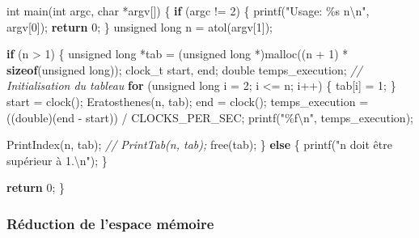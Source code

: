 \documentclass[
    ]{article}
\newenvironment{Shaded}{}{}
\newcommand{\CommentTok}[1]{\textcolor[rgb]{0.38,0.63,0.69}{\textit{#1}}}
\newcommand{\ControlFlowTok}[1]{\textcolor[rgb]{0.00,0.44,0.13}{\textbf{#1}}}
\newcommand{\DataTypeTok}[1]{\textcolor[rgb]{0.56,0.13,0.00}{#1}}
\newcommand{\DecValTok}[1]{\textcolor[rgb]{0.25,0.63,0.44}{#1}}
\newcommand{\KeywordTok}[1]{\textcolor[rgb]{0.00,0.44,0.13}{\textbf{#1}}}
\newcommand{\NormalTok}[1]{#1}
\newcommand{\SpecialCharTok}[1]{\textcolor[rgb]{0.25,0.44,0.63}{#1}}
\newcommand{\StringTok}[1]{\textcolor[rgb]{0.25,0.44,0.63}{#1}}
\begin{document}
\begin{Shaded}
\begin{Highlighting}[]
\DataTypeTok{int}\NormalTok{ main(}\DataTypeTok{int}\NormalTok{ argc, }\DataTypeTok{char}\NormalTok{ *argv[])}
\NormalTok{\{}
    \ControlFlowTok{if}\NormalTok{ (argc != }\DecValTok{2}\NormalTok{)}
\NormalTok{    \{}
\NormalTok{        printf(}\StringTok{"Usage: \%s n}\SpecialCharTok{\textbackslash{}n}\StringTok{"}\NormalTok{, argv[}\DecValTok{0}\NormalTok{]);}
        \ControlFlowTok{return} \DecValTok{0}\NormalTok{;}
\NormalTok{    \}}
    \DataTypeTok{unsigned} \DataTypeTok{long}\NormalTok{ n = atol(argv[}\DecValTok{1}\NormalTok{]);}

    \ControlFlowTok{if}\NormalTok{ (n \textgreater{} }\DecValTok{1}\NormalTok{)}
\NormalTok{    \{}
        \DataTypeTok{unsigned} \DataTypeTok{long}\NormalTok{ *tab = (}\DataTypeTok{unsigned} \DataTypeTok{long}\NormalTok{ *)malloc((n + }\DecValTok{1}\NormalTok{) * }\KeywordTok{sizeof}\NormalTok{(}\DataTypeTok{unsigned} \DataTypeTok{long}\NormalTok{));}
\NormalTok{        clock\_t start, end;}
        \DataTypeTok{double}\NormalTok{ temps\_execution;}
        \CommentTok{// Initialisation du tableau}
        \ControlFlowTok{for}\NormalTok{ (}\DataTypeTok{unsigned} \DataTypeTok{long}\NormalTok{ i = }\DecValTok{2}\NormalTok{; i \textless{}= n; i++)}
\NormalTok{        \{}
\NormalTok{            tab[i] = }\DecValTok{1}\NormalTok{;}
\NormalTok{        \}}
\NormalTok{        start = clock();}
\NormalTok{        Eratosthenes(n, tab);}
\NormalTok{        end = clock();}
\NormalTok{        temps\_execution = ((}\DataTypeTok{double}\NormalTok{)(end {-} start)) / CLOCKS\_PER\_SEC;}
\NormalTok{        printf(}\StringTok{"\%f}\SpecialCharTok{\textbackslash{}n}\StringTok{"}\NormalTok{, temps\_execution);}

\NormalTok{        PrintIndex(n, tab);}
        \CommentTok{// PrintTab(n, tab);}
\NormalTok{        free(tab);}
\NormalTok{    \}}
    \ControlFlowTok{else}
\NormalTok{    \{}
\NormalTok{        printf(}\StringTok{"n doit être supérieur à 1.}\SpecialCharTok{\textbackslash{}n}\StringTok{"}\NormalTok{);}
\NormalTok{    \}}

    \ControlFlowTok{return} \DecValTok{0}\NormalTok{;}
\NormalTok{\}}
\end{Highlighting}
\end{Shaded}

\hypertarget{ruxe9duction-de-lespace-muxe9moire}{%
\subsubsection{Réduction de l'espace
mémoire}\label{ruxe9duction-de-lespace-muxe9moire}}
\end{document}
